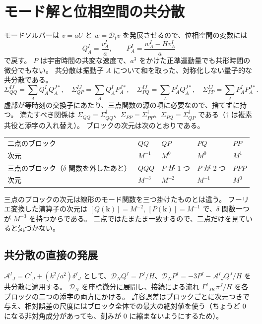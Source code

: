 \documentclass[a4paper,11pt]{ltjsarticle}
\newcommand{\Dt}{\mathcal{D}_t}
\newcommand{\DN}{\mathcal{D}_N}
\begin{document}
\section{モード解と位相空間の共分散}
\label{app:oracle}

モードソルバーは $v=aU$ と $w=\Dt v$ を発展させるので、位相空間の変数には
\[
Q^I_A=\frac{v^I_A}{a},\qquad P^I_A=\frac{w^I_A-Hv^I_A}{a}
\]
で戻す。
$P$ は宇宙時間の共変な速度で、$a^3$ をかけた正準運動量でも共形時間の微分でもない。
共分散は振動子 $A$ について和を取った、対称化しない量子的な共分散である。
\[
\Sigma_{QQ}^{IJ}=\sum_AQ^I_AQ^{J*}_A,\quad
\Sigma_{QP}^{IJ}=\sum_AQ^I_AP^{J*}_A,\quad
\Sigma_{PQ}^{IJ}=\sum_AP^I_AQ^{J*}_A,\quad
\Sigma_{PP}^{IJ}=\sum_AP^I_AP^{J*}_A .
\]
虚部が等時刻の交換子にあたり、三点関数の源の項に必要なので、捨てずに持つ。
満たすべき関係は $\Sigma_{QQ}=\Sigma_{QQ}^\dagger$、$\Sigma_{PP}=\Sigma_{PP}^\dagger$、$\Sigma_{PQ}=\Sigma_{QP}^\dagger$ である（$\dagger$ は複素共役と添字の入れ替え）。
ブロックの次元は次のとおりである。
\begin{center}
\begin{tabular}{lllll}
\toprule
二点のブロック & $QQ$ & $QP$ & $PQ$ & $PP$ \\
次元 & $M^{-1}$ & $M^0$ & $M^0$ & $M^1$ \\
\midrule
三点のブロック（$\delta$ 関数を外したあと） & $QQQ$ & $P$ が 1 つ & $P$ が 2 つ & $PPP$ \\
次元 & $M^{-3}$ & $M^{-2}$ & $M^{-1}$ & $M^0$ \\
\bottomrule
\end{tabular}
\end{center}
三点のブロックの次元は線形のモード関数を三つ掛けたものとは違う。
フーリエ変換した演算子の次元は $[Q(\mathbf k)]=M^{-2}$, $[P(\mathbf k)]=M^{-1}$ で、$\delta$ 関数一つが $M^{-3}$ を持つからである。
二点ではたまたま一致するので、二点だけを見ていると気づかない。

\subsection{共分散の直接の発展}
$\mathcal A^I{}_J=C^I{}_J+(k^2/a^2)\delta^I{}_J$ として、$\DN Q^I=P^I/H$、$\DN P^I=-3P^I-\mathcal A^I{}_JQ^J/H$ を共分散に適用する。
$\DN$ を座標微分に展開し、接続による流れ $\Gamma^I{}_{JK}\pi^J/H$ を各ブロックの二つの添字の両方にかける。
許容誤差はブロックごとに次元つきで与え、相対誤差の尺度にはブロック全体での最大の絶対値を使う（ちょうど 0 になる非対角成分があっても、刻みが 0 に縮まないようにするため）。
\end{document}
